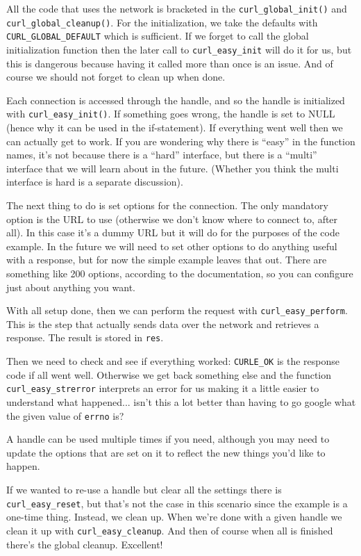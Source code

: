 All the code that uses the network is bracketed in the \texttt{curl\_global\_init()} and \texttt{curl\_global\_cleanup()}. For the initialization, we take the defaults with \texttt{CURL\_GLOBAL\_DEFAULT} which is sufficient. If we forget to call the global initialization function then the later call to \texttt{curl\_easy\_init} will do it for us, but this is dangerous because having it called more than once is an issue. And of course we should not forget to clean up when done.

Each connection is accessed through the handle, and so the handle is initialized with \texttt{curl\_easy\_init()}. If something goes wrong, the handle is set to NULL (hence why it can be used in the if-statement). If everything went well then we can actually get to work. If you are wondering why there is ``easy'' in the function names, it's not because there is a ``hard'' interface, but there is a ``multi'' interface that we will learn about in the future. (Whether you think the multi interface is hard is a separate discussion).

The next thing to do is set options for the connection. The only mandatory option is the URL to use (otherwise we don't know where to connect to, after all). In this case it's a dummy URL but it will do for the purposes of the code example. In the future we will need to set other options to do anything useful with a response, but for now the simple example leaves that out. There are something like 200 options, according to the documentation, so you can configure just about anything you want.

With all setup done, then we can perform the request with \texttt{curl\_easy\_perform}. This is the step that actually sends data over the network and retrieves a response. The result is stored in \texttt{res}.

Then we need to check and see if everything worked: \texttt{CURLE\_OK} is the response code if all went well. Otherwise we get back something else and the function \texttt{curl\_easy\_strerror} interprets an error for us making it a little easier to understand what happened... isn't this a lot better than having to go google what the given value of \texttt{errno} is?

A handle can be used multiple times if you need, although you may need to update the options that are set on it to reflect the new things you'd like to happen.

If we wanted to re-use a handle but clear all the settings there is \texttt{curl\_easy\_reset}, but that's not the case in this scenario since the example is a one-time thing. Instead, we clean up. When we're done with a given handle we clean it up with \texttt{curl\_easy\_cleanup}. And then of course when all is finished there's the global cleanup. Excellent!

